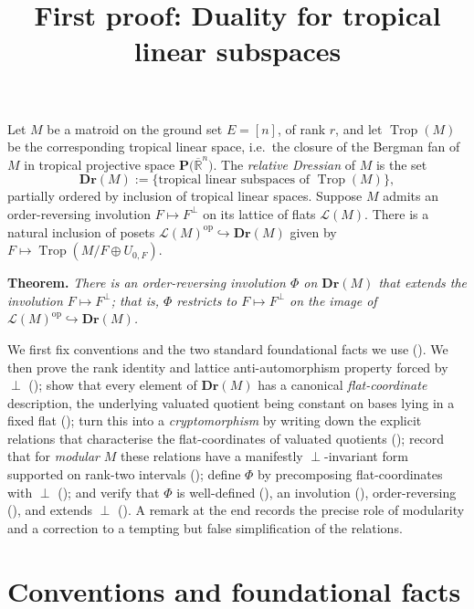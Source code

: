 \documentclass{article}
\title{First proof: Duality for tropical linear subspaces}
\author{}
\date{}
\theoremstyle{definition}
\newcommand{\Rbar}{\overline{\mathbb{R}}}
\newcommand{\Trop}{\operatorname{Trop}}
\newcommand{\op}{\operatorname{op}}
\newcommand{\into}{\hookrightarrow}
\newcommand{\Dr}{\mathbf{Dr}}
\newcommand{\cLL}{\mathcal{L}}
\newcommand{\PT}[1]{\mathbf{P}\big(\Rbar^{#1}\big)}
\begin{document}
\maketitle

\noindent
Let $M$ be a matroid on the ground set $E=[n]$, of rank $r$, and let $\Trop(M)$ be the
corresponding tropical linear space, i.e.\ the closure of the Bergman fan of $M$ in tropical
projective space $\PT{n}$. The \emph{relative Dressian} of $M$ is the set
\[
  \Dr(M):=\{\text{tropical linear subspaces of }\Trop(M)\},
\]
partially ordered by inclusion of tropical linear spaces. Suppose $M$ admits an order-reversing
involution $F\mapsto F^{\perp}$ on its lattice of flats $\cLL(M)$. There is a natural inclusion of
posets $\cLL(M)^{\op}\into\Dr(M)$ given by $F\mapsto\Trop(M/F\oplus U_{0,F})$.

\medskip
\noindent\textbf{Theorem.} \emph{There is an order-reversing involution $\Phi$ on $\Dr(M)$ that
extends the involution $F\mapsto F^{\perp}$; that is, $\Phi$ restricts to $F\mapsto F^{\perp}$ on the
image of $\cLL(M)^{\op}\into\Dr(M)$.}

\medskip

We first fix conventions and the two standard foundational facts we use (). We then
prove the rank identity and lattice anti-automorphism property forced by $\perp$ ();
show that every element of $\Dr(M)$ has a canonical \emph{flat-coordinate} description, the underlying
valuated quotient being constant on bases lying in a fixed flat (); turn this
into a \emph{cryptomorphism} by writing down the explicit relations that characterise the
flat-coordinates of valuated quotients (); record that for \emph{modular} $M$ these
relations have a manifestly $\perp$-invariant form supported on rank-two intervals
(); define $\Phi$ by precomposing flat-coordinates with $\perp$ ();
and verify that $\Phi$ is well-defined (), an involution (),
order-reversing (), and extends $\perp$ (). A remark at the end records
the precise role of modularity and a correction to a tempting but false simplification of the
relations.

\section{Conventions and foundational facts}\label{ssec:found}
\end{document}
